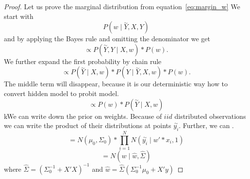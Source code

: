 \begin{proof}
Let us prove the marginal distribution from equation~\ref{eq:margin_w} 
We start with
\begin{equation}
    P(w \mid \overset{\sim}{Y}, X, Y) 
\end{equation}
and by applying the Bayes rule and omitting the denominator we get
\begin{equation}
    \propto   P(\overset{\sim}{Y}, Y \mid X, w) * P(w).
\end{equation}
We further expand the first probability by chain rule
\begin{equation}
    \propto   P(\overset{\sim}{Y} \mid X, w) * P(Y \mid \overset{\sim}{Y},  X, w) * P(w).
\end{equation}
The middle term will disappear, because it is our deterministic way how to convert hidden model to probit model.
\begin{equation}
    \propto   P(w) * P(\overset{\sim}{Y} \mid X, w)
\end{equation}
kWe can write down the prior on weights. Because of $iid$ distributed observations we can write the product of their distributions at points $\overset{\sim}{y_i}$. Further, we can .
\begin{equation}
    = N(\mu_0, \Sigma_0) * \prod_{i=1}^N N(\overset{\sim}{y_i} \mid w' * x_i, 1)
\end{equation}
\begin{equation}
    = N(w  \mid  \hat{w}, \hat{\Sigma})
\end{equation}
where $\hat{\Sigma} = (\Sigma_0^{-1} + X'X)^{-1}$ and $\hat{w} = \hat{\Sigma}(\Sigma_0^{-1}\mu_0 + X'y)$
\end{proof}

